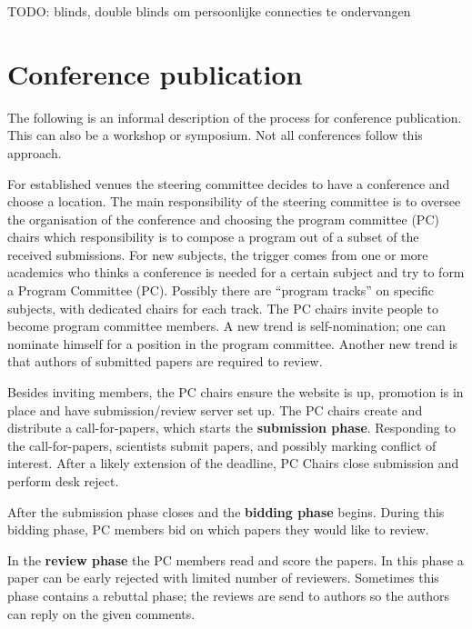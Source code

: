 \documentclass{ou-report}
\newcommand{\todo}[1]{{\color{red} TODO: #1}}
\begin{document}
\todo{blinds, double blinds om persoonlijke connecties te ondervangen}

\section{Conference publication}
The following is an informal description of the process for conference 
publication. This can also be a workshop or symposium. Not all conferences 
follow this approach.

For established venues the steering committee decides to have a conference and 
choose a location. The main responsibility of the steering committee is to 
oversee the organisation of the conference and choosing the program 
committee (PC) chairs which responsibility is to compose a program out of a 
subset of the received 
submissions. For new subjects, the trigger comes from one or more 
academics who thinks a conference is needed for a certain subject and try to 
form a Program Committee (PC). Possibly there are ``program tracks'' on specific 
subjects, with dedicated chairs for each track.
The PC chairs invite people to become program 
committee members. A new trend is self-nomination; one can nominate himself for 
a position in the program committee. Another new trend is that authors of 
submitted papers are required to review.

Besides inviting members, the PC chairs ensure the website is up, promotion 
is in place and have submission/review server set up.
The PC chairs create and distribute a call-for-papers, which starts the 
\textbf{submission phase}.
Responding to the call-for-papers, scientists submit papers, and possibly 
marking conflict of interest. 
After a likely extension of the deadline, PC Chairs close submission and 
perform desk reject.

After the submission phase closes and the \textbf{bidding phase} begins. During 
this bidding phase, PC members bid on which papers they would like to review.

In the \textbf{review phase} the PC members read and score the papers. In this 
phase a paper can be early rejected with limited number of reviewers. Sometimes 
this phase contains a rebuttal phase; the reviews are send to authors so the 
authors can reply on the given comments.
\end{document}
